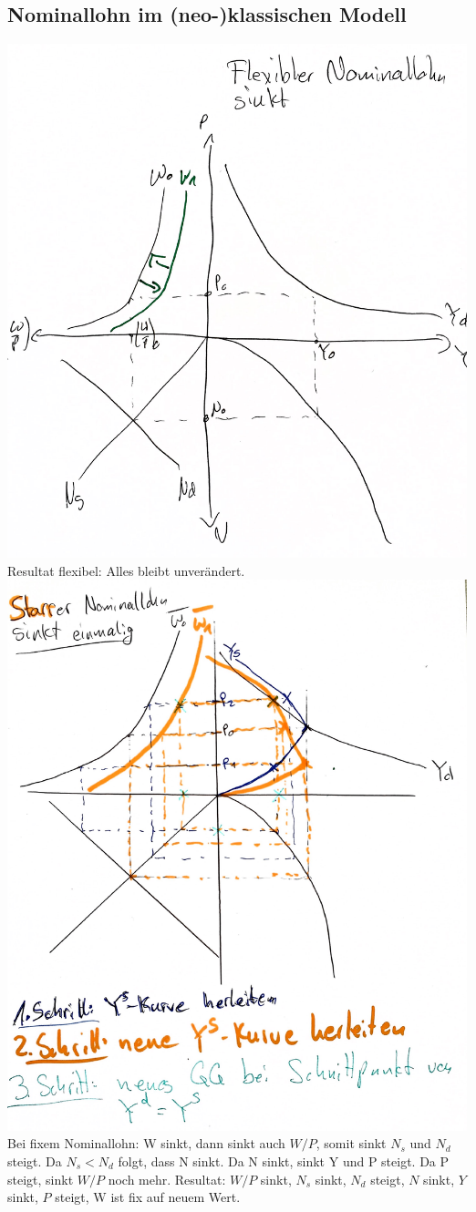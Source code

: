 \documentclass{scrartcl}
\begin{document}
\subsection{Nominallohn im (neo-)klassischen Modell}
\includegraphics[width=.75\textwidth]{Bilder/Klassik_Nominallohn_Flex.pdf}\\
Resultat flexibel: Alles bleibt unver\"{a}ndert.\\
\includegraphics[width=.75\textwidth]{Bilder/Klassik_Nominallohn_Fix.pdf}\\
Bei fixem Nominallohn: W sinkt, dann sinkt auch $W/P$, somit sinkt $N_s$ und $N_d$ steigt. Da $N_s < N_d$ folgt, dass N sinkt. Da N sinkt, sinkt Y und P steigt. Da P steigt, sinkt $W/P$ noch mehr.
Resultat: $W/P$ sinkt, $N_s$ sinkt, $N_d$ steigt, $N$ sinkt, $Y$ sinkt, $P$ steigt, W ist fix auf neuem Wert.
\end{document}
